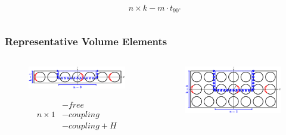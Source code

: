 \documentclass[first,firstsupp,lastsupp,last,hyperref,table]{ETHclass}
\begin{document}
\begin{frame}
\begin{columns}[c]
\begin{column}{0.45\textwidth}
\begin{figure}
\end{figure}
\vspace{-0.25cm}
\begin{equation*}
n\times  k-m\cdot t_{90^{\circ}}
\end{equation*}
\end{column}
\end{columns}
\end{frame}

\addtocounter{framenumber}{-1}

\begin{frame}
\frametitle{\vspace{0.2cm}\small Representative Volume Elements}
\vspace{-1.25cm}
\centering
\begin{columns}[c]
\begin{column}{0.55\textwidth}
\centering
\begin{figure}
\centering
\includegraphics[width=\columnwidth]{freeThinPly.pdf}
\end{figure}
\begin{equation*}
\begin{aligned}
&-free\\
n\times 1&-coupling\\
&-coupling+H\\
\end{aligned}
\end{equation*}
\end{column}
\begin{column}{0.45\textwidth}
\centering
\begin{figure}
\centering
\includegraphics[width=\columnwidth]{freeThickPly.pdf}

\end{figure}
\end{column}
\end{columns}
\end{frame}
\end{document}
